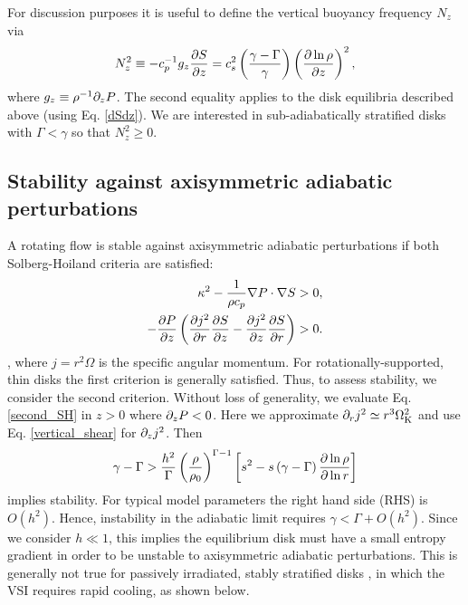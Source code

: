For discussion purposes it is useful to define the vertical buoyancy
frequency $N_z$ via 
\begin{align}
  N_z^2 \equiv - c_p^{-1}g_z \frac{\partial S}{\partial z} = c_s^2 \left(\frac{\gamma -
      \Gamma}{\gamma}\right)\left(\frac{\partial\ln\rho}{\partial z}\right)^2,   \label{nzsq_def}
\end{align}
where $g_z\equiv \rho^{-1}\partial_zP $. The second equality applies to the
disk equilibria described above (using Eq. \ref{dSdz}). We are
interested in sub-adiabatically stratified disks with $\Gamma <
\gamma$ so that $N_z^2\geq0$. %

\subsection{Stability against axisymmetric adiabatic
  perturbations}\label{solberg}
A rotating flow is stable against axisymmetric adiabatic perturbations
if both Solberg-Hoiland criteria  are satisfied:
\begin{align}
  \kappa^2 - \frac{1}{\rho c_p}\nabla P \cdot \nabla S &> 0,\\
  -\frac{\partial P}{\partial z}\left(\frac{\partial j^2}{\partial r}\frac{\partial S}{ \partial z} -
    \frac{\partial j^2}{\partial z}\frac{\partial S}{\partial r} \right)&>0. \label{second_SH} 
\end{align}
\citep{tassoul78}, where $j=r^2\Omega$ is the specific angular
momentum. For rotationally-supported, thin disks %
the first criterion is generally satisfied. 
Thus, to assess stability, we consider the second
criterion. 
Without loss of generality, we evaluate Eq. \ref{second_SH} in $z>0$
where $\partial_zP<0$. Here we approximate $\partial_r j^2\simeq r^3\Omega_{\rm K}^2$ and
use Eq. \ref{vertical_shear} for $\partial_zj^2$. Then 
\begin{align}\label{solberg2}
  \gamma - \Gamma > \frac{ h^2}{\Gamma}
  \left(\frac{\rho}{\rho_0}\right)^{\Gamma-1} \left[s^2
    -s\left(\gamma-\Gamma\right)\frac{\partial\ln{\rho}}{\partial\ln{r}} \right]
\end{align} 
implies stability. For typical model parameters the right hand
side (RHS) is $O( h^2)$. Hence, instability in the adiabatic limit  
requires $\gamma < \Gamma + O( h^2)$. Since we consider
$ h\ll1$, this implies the equilibrium disk must have a small
entropy gradient in order to be unstable to axisymmetric adiabatic
perturbations. This is generally not true for passively irradiated, stably
stratified disks \citep{chiang97}, in which the VSI requires rapid
cooling, as shown below. 

